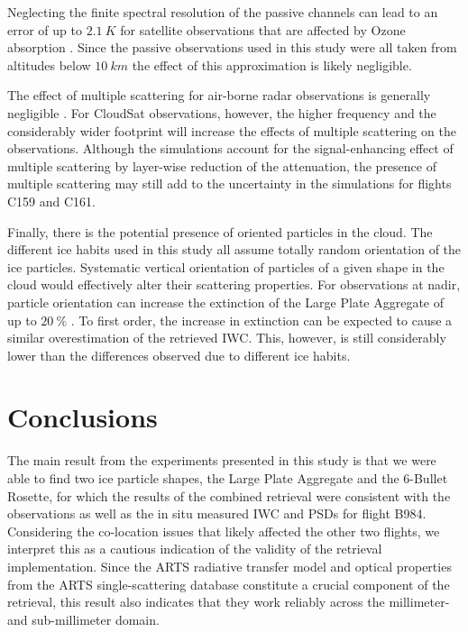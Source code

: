 \documentclass[journal abbreviation, manuscript]{copernicus}
\begin{document}
Neglecting the finite spectral resolution of the passive channels can lead to an
error of up to $2.1\ \unit{K}$ for satellite observations that are affected by
Ozone absorption \citep{eriksson20}. Since the passive observations used in this
study were all taken from altitudes below $10\ \unit{km}$ the effect of this
approximation is likely negligible.

The effect of multiple scattering for air-borne radar observations is generally
negligible \citep{battaglia10}. For CloudSat observations, however, the higher
frequency and the considerably wider footprint will increase the effects of
multiple scattering on the observations. Although the simulations account for
the signal-enhancing effect of multiple scattering by layer-wise reduction of
the attenuation, the presence of multiple scattering may still add to the
uncertainty in the simulations for flights C159 and C161.

Finally, there is the potential presence of oriented particles in the cloud. The
different ice habits used in this study all assume totally random orientation of
the ice particles. Systematic vertical orientation of particles of a given shape
in the cloud would effectively alter their scattering properties. For
observations at nadir, particle orientation can increase the extinction of the
Large Plate Aggregate of up to $20\ \unit{\%}$ \citep{barlakas21}. To first
order, the increase in extinction can be expected to cause a similar
overestimation of the retrieved IWC. This, however, is still considerably lower
than the differences observed due to different ice habits.

\section{Conclusions}
\label{sec:conclusions}

The main result from the experiments presented in this study is that we were
able to find two ice particle shapes, the Large Plate Aggregate and the 6-Bullet
Rosette, for which the results of the combined retrieval were consistent with
the observations as well as the in situ measured IWC and PSDs for flight B984.
Considering the co-location issues that likely affected the other two flights,
we interpret this as a cautious indication of the validity of the retrieval
implementation. Since the ARTS radiative transfer model and optical properties
from the ARTS single-scattering database constitute a crucial component of the
retrieval, this result also indicates that they work reliably across the
millimeter- and sub-millimeter domain.
\end{document}
